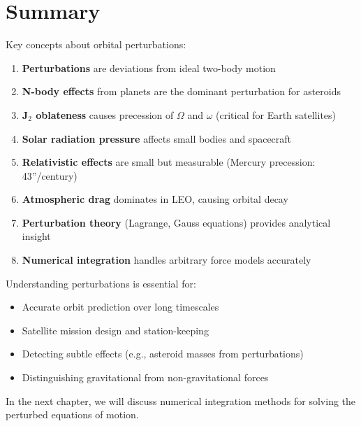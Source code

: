 \section{Summary}

Key concepts about orbital perturbations:

\begin{enumerate}
    \item \textbf{Perturbations} are deviations from ideal two-body motion
    \item \textbf{N-body effects} from planets are the dominant perturbation for asteroids
    \item \textbf{J$_2$ oblateness} causes precession of $\Omega$ and $\omega$ (critical for Earth satellites)
    \item \textbf{Solar radiation pressure} affects small bodies and spacecraft
    \item \textbf{Relativistic effects} are small but measurable (Mercury precession: 43''/century)
    \item \textbf{Atmospheric drag} dominates in LEO, causing orbital decay
    \item \textbf{Perturbation theory} (Lagrange, Gauss equations) provides analytical insight
    \item \textbf{Numerical integration} handles arbitrary force models accurately
\end{enumerate}

Understanding perturbations is essential for:
\begin{itemize}
    \item Accurate orbit prediction over long timescales
    \item Satellite mission design and station-keeping
    \item Detecting subtle effects (e.g., asteroid masses from perturbations)
    \item Distinguishing gravitational from non-gravitational forces
\end{itemize}

In the next chapter, we will discuss numerical integration methods for solving the perturbed equations of motion.
